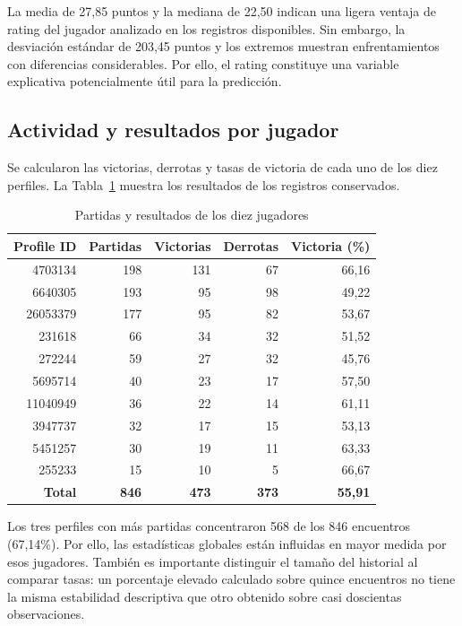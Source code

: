 \documentclass[12pt,a4paper]{article}
\begin{document}
La media de 27,85 puntos y la mediana de 22,50 indican una ligera ventaja de rating del jugador analizado en los registros disponibles. Sin embargo, la desviación estándar de 203,45 puntos y los extremos muestran enfrentamientos con diferencias considerables. Por ello, el rating constituye una variable explicativa potencialmente útil para la predicción.

\subsection{Actividad y resultados por jugador}

Se calcularon las victorias, derrotas y tasas de victoria de cada uno de los diez perfiles. La Tabla~\ref{tab:jugadores} muestra los resultados de los registros conservados.
\begin{table}[htbp]
\centering\footnotesize
\caption{Partidas y resultados de los diez jugadores}
\label{tab:jugadores}
\begin{tabular}{rrrrr}
\toprule
\textbf{Profile ID} & \textbf{Partidas} & \textbf{Victorias} & \textbf{Derrotas} & \textbf{Victoria (\%)}\\
\midrule
4703134 & 198 & 131 & 67 & 66,16\\
6640305 & 193 & 95 & 98 & 49,22\\
26053379 & 177 & 95 & 82 & 53,67\\
231618 & 66 & 34 & 32 & 51,52\\
272244 & 59 & 27 & 32 & 45,76\\
5695714 & 40 & 23 & 17 & 57,50\\
11040949 & 36 & 22 & 14 & 61,11\\
3947737 & 32 & 17 & 15 & 53,13\\
5451257 & 30 & 19 & 11 & 63,33\\
255233 & 15 & 10 & 5 & 66,67\\
\midrule
\textbf{Total} & \textbf{846} & \textbf{473} & \textbf{373} & \textbf{55,91}\\
\bottomrule
\end{tabular}
\end{table}

Los tres perfiles con más partidas concentraron 568 de los 846 encuentros (67,14\%). Por ello, las estadísticas globales están influidas en mayor medida por esos jugadores. También es importante distinguir el tamaño del historial al comparar tasas: un porcentaje elevado calculado sobre quince encuentros no tiene la misma estabilidad descriptiva que otro obtenido sobre casi doscientas observaciones.
\end{document}
